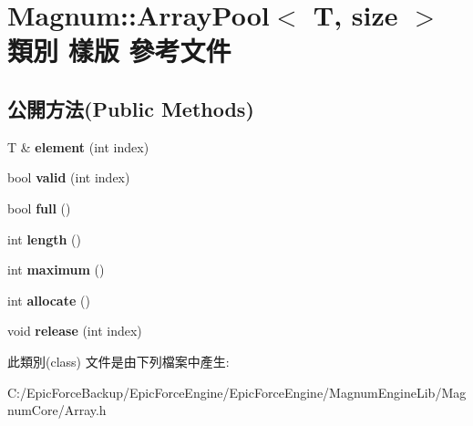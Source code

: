 \hypertarget{class_magnum_1_1_array_pool}{}\section{Magnum\+:\+:Array\+Pool$<$ T, size $>$ 類別 樣版 參考文件}
\label{class_magnum_1_1_array_pool}
\subsection*{公開方法(Public Methods)}
\begin{DoxyCompactItemize}
\item 
T \& {\bfseries element} (int index)\hypertarget{class_magnum_1_1_array_pool_ab50508863e5b50c910c637fec4c965ee}{}\label{class_magnum_1_1_array_pool_ab50508863e5b50c910c637fec4c965ee}

\item 
bool {\bfseries valid} (int index)\hypertarget{class_magnum_1_1_array_pool_a05dbce6bd20556225cd24e76a9f02cb2}{}\label{class_magnum_1_1_array_pool_a05dbce6bd20556225cd24e76a9f02cb2}

\item 
bool {\bfseries full} ()\hypertarget{class_magnum_1_1_array_pool_a7d8d3ca5cd6a2055cf3c6a583401e8be}{}\label{class_magnum_1_1_array_pool_a7d8d3ca5cd6a2055cf3c6a583401e8be}

\item 
int {\bfseries length} ()\hypertarget{class_magnum_1_1_array_pool_aeadb2f9aa5052dc63fb900b8928274fe}{}\label{class_magnum_1_1_array_pool_aeadb2f9aa5052dc63fb900b8928274fe}

\item 
int {\bfseries maximum} ()\hypertarget{class_magnum_1_1_array_pool_aedb0f945e1cfd457cbcf71d0672b6960}{}\label{class_magnum_1_1_array_pool_aedb0f945e1cfd457cbcf71d0672b6960}

\item 
int {\bfseries allocate} ()\hypertarget{class_magnum_1_1_array_pool_a8fbbbe12e5f2f455d3dd7e1fc1b149dd}{}\label{class_magnum_1_1_array_pool_a8fbbbe12e5f2f455d3dd7e1fc1b149dd}

\item 
void {\bfseries release} (int index)\hypertarget{class_magnum_1_1_array_pool_a7b820b64c111e87aea36693002be120c}{}\label{class_magnum_1_1_array_pool_a7b820b64c111e87aea36693002be120c}

\end{DoxyCompactItemize}


此類別(class) 文件是由下列檔案中產生\+:\begin{DoxyCompactItemize}
\item 
C\+:/\+Epic\+Force\+Backup/\+Epic\+Force\+Engine/\+Epic\+Force\+Engine/\+Magnum\+Engine\+Lib/\+Magnum\+Core/Array.\+h\end{DoxyCompactItemize}
